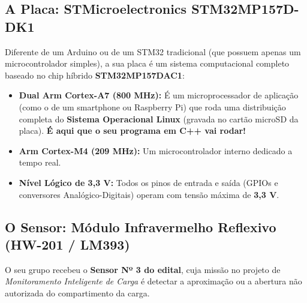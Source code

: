 \documentclass[11pt,a4paper]{article}
\begin{document}
\subsection{A Placa: STMicroelectronics STM32MP157D-DK1}
Diferente de um Arduino ou de um STM32 tradicional (que possuem apenas um microcontrolador simples), a sua placa é um sistema computacional completo baseado no chip híbrido \textbf{STM32MP157DAC1}:
\begin{itemize}[leftmargin=*]
    \item \textbf{Dual Arm Cortex-A7 (800 MHz):} É um microprocessador de aplicação (como o de um smartphone ou Raspberry Pi) que roda uma distribuição completa do \textbf{Sistema Operacional Linux} (gravada no cartão microSD da placa). \textbf{É aqui que o seu programa em C++ vai rodar!}
    \item \textbf{Arm Cortex-M4 (209 MHz):} Um microcontrolador interno dedicado a tempo real.
    \item \textbf{Nível Lógico de 3,3 V:} Todos os pinos de entrada e saída (GPIOs e conversores Analógico-Digitais) operam com tensão máxima de \textbf{3,3 V}.
\end{itemize}

\subsection{O Sensor: Módulo Infravermelho Reflexivo (HW-201 / LM393)}
O seu grupo recebeu o \textbf{Sensor Nº 3 do edital}, cuja missão no projeto de \textit{Monitoramento Inteligente de Carga} é detectar a aproximação ou a abertura não autorizada do compartimento da carga.
\end{document}
